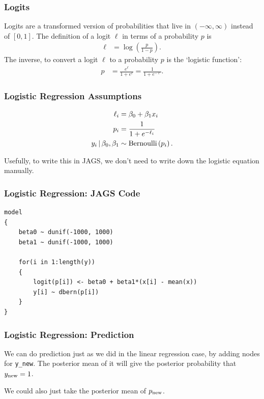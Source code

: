 \documentclass{beamer}
\newcommand{\given}{\,|\,}
\begin{document}
\begin{frame}
\frametitle{Logits}
Logits are a transformed version of probabilities that live in
$(-\infty, \infty)$ instead of $[0, 1]$. The definition of a logit $\ell$
in terms of a probability $p$ is
\begin{align}
\ell &= \log\left(\frac{p}{1-p}\right).
\end{align}
\pause
The inverse, to convert a logit $\ell$ to a probability $p$
is the `logistic function':
\begin{align}
p &= \frac{e^\ell}{1 + e^\ell} = \frac{1}{1 + e^{-\ell}}.
\end{align}

\end{frame}

\begin{frame}
\frametitle{Logistic Regression Assumptions}

\begin{align}
\ell_i &= \beta_0 + \beta_1 x_i \\
p_i &= \frac{1}{1 + e^{-\ell_i}}\\
y_i \given \beta_0, \beta_1 &\sim \textnormal{Bernoulli}\left(p_i\right).
\end{align}
\pause

Usefully, to write this in JAGS, we don't need to write down the logistic
equation manually.

\end{frame}


\begin{frame}[fragile]
\frametitle{Logistic Regression: JAGS Code}

\begin{verbatim}
model
{
    beta0 ~ dunif(-1000, 1000)
    beta1 ~ dunif(-1000, 1000)

    for(i in 1:length(y))
    {
        logit(p[i]) <- beta0 + beta1*(x[i] - mean(x))
        y[i] ~ dbern(p[i])
    }
}
\end{verbatim}

\end{frame}

\begin{frame}[fragile]
\frametitle{Logistic Regression: Prediction}
We can do prediction just as we did in the linear regression case,
by adding nodes for \texttt{y_new}. The posterior mean of it
will give the posterior probability that $y_{\rm new} = 1$.\\[0.5em]\pause

We could also just take the posterior mean of $p_{\rm new}$.
\end{frame}
\end{document}
